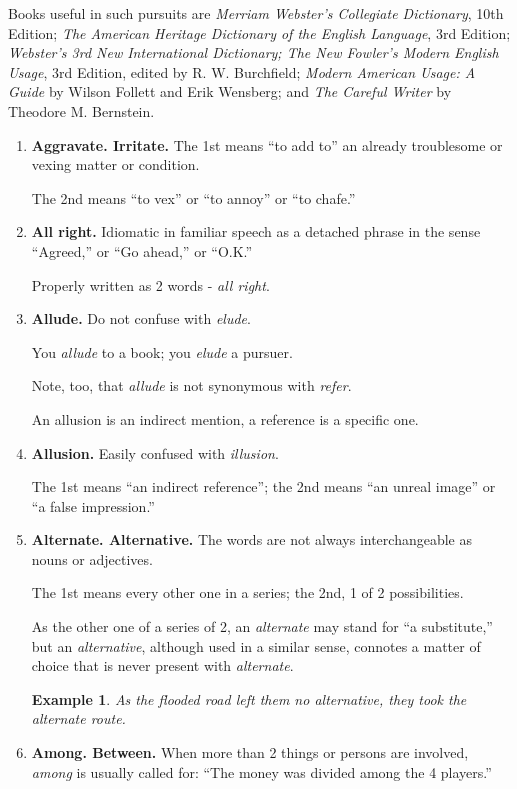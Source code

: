 \documentclass{book}
\numberwithin{equation}{section}
\newtheorem{example}{Example}[chapter]
\begin{document}
Books useful in such pursuits are \textit{Merriam Webster's Collegiate Dictionary}, 10th Edition; \textit{The American Heritage Dictionary of the English Language}, 3rd Edition; \textit{Webster's 3rd New International Dictionary; The New Fowler's Modern English Usage}, 3rd Edition, edited by R. W. Burchfield; \textit{Modern American Usage: A Guide} by Wilson Follett and Erik Wensberg; and \textit{The Careful Writer} by Theodore M. Bernstein.
\begin{enumerate}
    \item \textbf{Aggravate. Irritate.} The 1st means ``to add to'' an already troublesome or vexing matter or condition.
    
    The 2nd means ``to vex'' or ``to annoy'' or ``to chafe.''
    \item \textbf{All right.} Idiomatic in familiar speech as a detached phrase in the sense ``Agreed,'' or ``Go ahead,'' or ``O.K.''
    
    Properly written as 2 words - \textit{all right}.
    \item \textbf{Allude.} Do not confuse with \textit{elude}.
    
    You \textit{allude} to a book; you \textit{elude} a pursuer.
    
    Note, too, that \textit{allude} is not synonymous with \textit{refer}.
    
    An allusion is an indirect mention, a reference is a specific one.
    \item \textbf{Allusion.} Easily confused with \textit{illusion}.
    
    The 1st means ``an indirect reference''; the 2nd means ``an unreal image'' or ``a false impression.''
    \item \textbf{Alternate. Alternative.} The words are not always interchangeable as nouns or adjectives.
    
    The 1st means every other one in a series; the 2nd, 1 of 2 possibilities.
    
    As the other one of a series of 2, an \textit{alternate} may stand for ``a substitute,'' but an \textit{alternative}, although used in a similar sense, connotes a matter of choice that is never present with \textit{alternate}.
    \begin{example}
        As the flooded road left them no alternative, they took the alternate route.
    \end{example}
    \item \textbf{Among. Between.} When more than 2 things or persons are involved, \textit{among} is usually called for: ``The money was divided among the 4 players.''
    

\end{enumerate}
\end{document}

